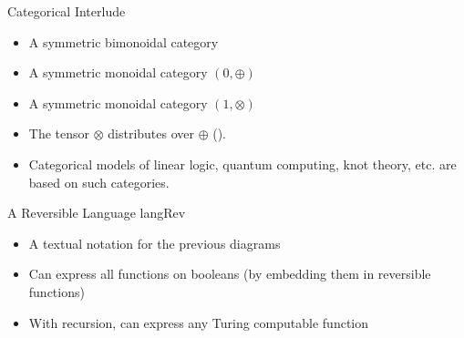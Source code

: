 \documentclass[11pt]{beamer}
\newcommand{\red}[1]{{\color{red}{#1}}}
\begin{document}
\begin{frame}{Categorical Interlude}

\begin{itemize}

  \vfill\item A symmetric bimonoidal category

  \vfill\item A symmetric monoidal category $(0,\oplus)$

  \vfill\item A symmetric monoidal category $(1,\otimes)$

  \vfill\item The tensor $\otimes$ distributes over $\oplus$ (\red{but
    not vice-versa}).

  \vfill\item Categorical models of linear logic, quantum computing,
  knot theory, etc. are based on such categories.

\end{itemize} 

\vfill

\end{frame}

\begin{frame}{A Reversible Language {{langRev}} }

\begin{itemize}

  \vfill\item A textual notation for the previous diagrams

  \vfill\item Can express all functions on booleans (by embedding them
  in reversible functions)

  \vfill\item With recursion, can express any Turing computable function

\end{itemize} 

\vfill

\end{frame}
\end{document}
